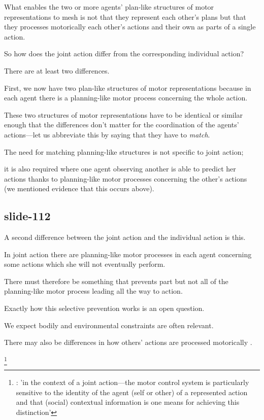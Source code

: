 \documentclass[12pt,\papersize]{extarticle}
\begin{document}
What enables the two or more agents' plan-like structures of motor representations to mesh is not that they represent each other's plans but that they processes motorically each other's actions and their own as parts of a single action.



So how does the joint action differ from the corresponding individual action?

There are at least two differences.

First, we now have two plan-like structures of motor representations because in each agent there is a planning-like motor process concerning the whole action.

These two structures of motor representations have to be identical or similar enough that the differences don’t matter for the coordination of the agents’ actions---let us abbreviate this by saying that they have to \emph{match}.

The need for matching planning-like structures is not specific to joint action;

it is also required where one agent observing another is able to predict her actions thanks to planning-like motor processes concerning the other’s actions (we mentioned evidence that this occurs above).

\subsection{slide-112}
A second difference between the joint action and the individual action is this.

In joint action there are planning-like motor processes in each agent concerning some actions which she will not eventually perform.

There must therefore be something that prevents part but not all of the planning-like motor process leading all the way to action.

Exactly how this selective prevention works is an open question.

We expect bodily and environmental constraints are often relevant.

There may also be differences in how others’ actions are processed motorically \citep[compare][]{novembre:2012_distinguishing}.

\footnote{\citep[p.\ 2901]{novembre:2012_distinguishing}: 'in the context of a joint action—the motor control system is particularly sensitive to the identity of the agent (self or other) of a represented action and that (social) contextual information is one means for achieving this distinction'}
\end{document}
